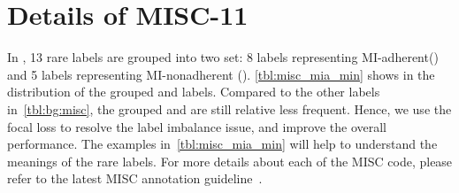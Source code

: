 \section{Details of MISC-11}
\label{sec:misc:our-clustering}
In , 13 rare labels are grouped into two set: 8 labels
representing MI-adherent(\MIA) and 5 labels representing
MI-nonadherent (\MIN). \autoref{tbl:misc_mia_min} shows in the
distribution of the grouped \MIA and \MIN labels. Compared to the
other labels in~\autoref{tbl:bg:misc}, the grouped \MIA and \MIN are
still relative less frequent. Hence, we use the focal loss to resolve
the label imbalance issue, and improve the overall performance. The
examples in~\autoref{tbl:misc_mia_min} will help to understand the
meanings of the rare labels. For more details about each of the MISC
code, please refer to the latest MISC annotation
guideline~\citep{houck2012motivational}.
